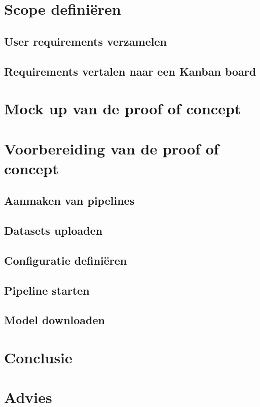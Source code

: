 
\section{Scope definiëren}\label{sec:ch7-scope-definieren}

\subsection{User requirements verzamelen}\label{subsec:ch7-user-requirements-verzamelen}

\subsection{Requirements vertalen naar een Kanban board}\label{subsec:ch7-requirements-vertalen-naar-een-kanban-board}

\section{Mock up van de proof of concept}\label{sec:ch7-mock-up-van-de-proof-of-concept}

\section{Voorbereiding van de proof of concept}\label{sec:ch7-voorbereiding-van-de-proof-of-concept}

\subsection{Aanmaken van pipelines}\label{subsec:ch7-aanmaken-van-pipelines}
\subsection{Datasets uploaden}\label{subsec:ch7-datasets-uploaden}
\subsection{Configuratie definiëren}\label{subsec:ch7-configuratie-definieren}
\subsection{Pipeline starten}\label{subsec:ch7-pipeline-starten}
\subsection{Model downloaden}\label{subsec:ch7-model-downloaden}


\section{Conclusie}\label{sec:ch7-conclusie}
\section{Advies}\label{sec:ch7-advies}